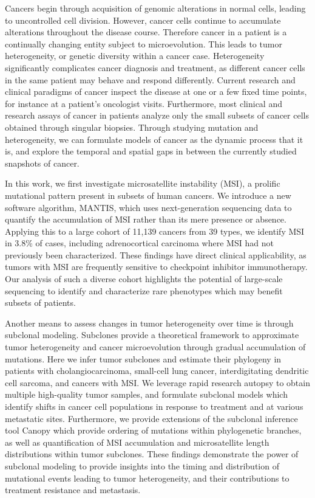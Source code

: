 
Cancers begin through acquisition of genomic alterations in normal cells, leading to uncontrolled cell division. However, cancer cells continue to accumulate alterations throughout the disease course. Therefore cancer in a patient is a continually changing entity subject to microevolution. This leads to tumor heterogeneity, or genetic diversity within a cancer case. Heterogeneity significantly complicates cancer diagnosis and treatment, as different cancer cells in the same patient may behave and respond differently. Current research and clinical paradigms of cancer inspect the disease at one or a few fixed time points, for instance at a patient's oncologist visits. Furthermore, most clinical and research assays of cancer in patients analyze only the small subsets of cancer cells obtained through singular biopsies. Through studying mutation and heterogeneity, we can formulate models of cancer as the dynamic process that it is, and explore the temporal and spatial gaps in between the currently studied snapshots of cancer.

In this work, we first investigate microsatellite instability (MSI), a prolific mutational pattern present in subsets of human cancers. We introduce a new software algorithm, MANTIS, which uses next-generation sequencing data to quantify the accumulation of MSI rather than its mere presence or absence. Applying this to a large cohort of 11,139 cancers from 39 types, we identify MSI in 3.8\% of cases, including adrenocortical carcinoma where MSI had not previously been characterized. These findings have direct clinical applicability, as tumors with MSI are frequently sensitive to checkpoint inhibitor immunotherapy. Our analysis of such a diverse cohort highlights the potential of large-scale sequencing to identify and characterize rare phenotypes which may benefit subsets of patients.

Another means to assess changes in tumor heterogeneity over time is through subclonal modeling. Subclones provide a theoretical framework to approximate tumor heterogeneity and cancer microevolution through gradual accumulation of mutations. Here we infer tumor subclones and estimate their phylogeny in patients with cholangiocarcinoma, small-cell lung cancer, interdigitating dendritic cell sarcoma, and cancers with MSI\@. We leverage rapid research autopsy to obtain multiple high-quality tumor samples, and formulate subclonal models which identify shifts in cancer cell populations in response to treatment and at various metastatic sites. Furthermore, we provide extensions of the subclonal inference tool Canopy which provide ordering of mutations within phylogenetic branches, as well as quantification of MSI accumulation and microsatellite length distributions within tumor subclones. These findings demonstrate the power of subclonal modeling to provide insights into the timing and distribution of mutational events leading to tumor heterogeneity, and their contributions to treatment resistance and metastasis.

